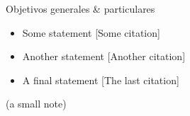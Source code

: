 \begin{frame}{\color{blue}Objetivos generales \& particulares}
  
  \begin{itemize}
  \item Some statement {\color{gray} [Some citation]}
  \item Another statement {\color{gray} [Another citation]}
  \item A final statement {\color{gray} [The last citation]}
  \end{itemize}
  
  \vspace{3ex}
  \begin{center}
    \scriptsize (a small note)
  \end{center}
  
\end{frame}

